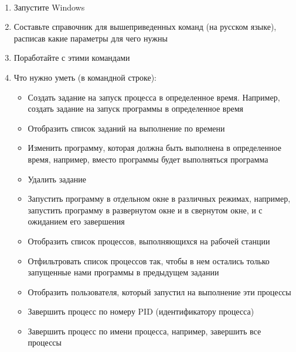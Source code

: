 \documentclass[a4paper,12pt]{article}
\begin{document}
    \begin{flushleft}
         \\[0.5em]
        \begin{enumerate}
            \item Запустите Windows
            \item Составьте справочник для вышеприведенных команд (на русском языке), расписав какие параметры для чего нужны
            \item Поработайте с этими командами
            \item Что нужно уметь (в командной строке):
            \begin{itemize}
                \item Создать задание на запуск процесса в определенное время. Например, создать задание на запуск программы  в определенное время
                \item Отобразить список заданий на выполнение по времени
                \item Изменить программу, которая должна быть выполнена в определенное время, например, вместо программы  будет выполняться программа 
                \item Удалить задание
                \item Запустить программу в отдельном окне в различных режимах, например, запустить программу  в развернутом окне и в свернутом окне, и с ожиданием его завершения
                \item Отобразить список процессов, выполняющихся на рабочей станции
                \item Отфильтровать список процессов так, чтобы в нем остались только запущенные нами программы  в предыдущем задании
                \item Отобразить пользователя, который запустил на выполнение эти процессы
                \item Завершить процесс по номеру PID (идентификатору процесса)
                \item Завершить процесс по имени процесса, например, завершить все процессы 
            \end{itemize}
        \end{enumerate}
    \end{flushleft}
\end{document}
